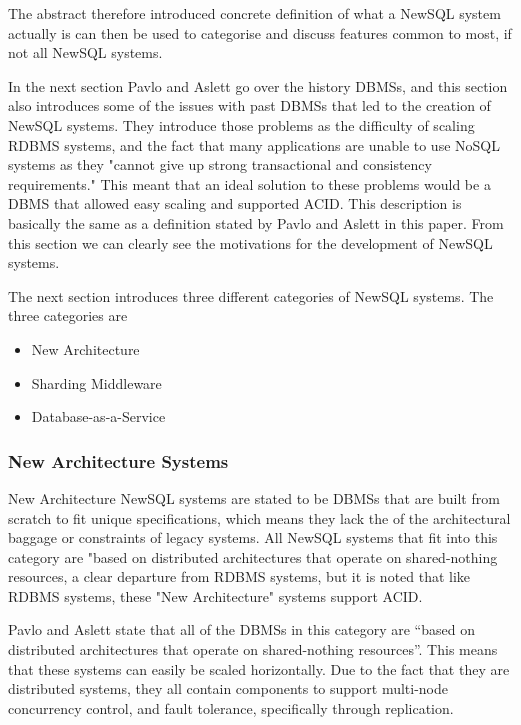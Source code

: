 \documentclass[10pt, conference]{IEEEtran}
\begin{document}
The abstract therefore introduced concrete definition of what a NewSQL system actually is can then be used to categorise and discuss features common to most, if not all NewSQL systems.

In the next section Pavlo and Aslett go over the history DBMSs, and this section also introduces some of the issues with past DBMSs that led to the creation of NewSQL systems. They introduce those problems as the difficulty of scaling RDBMS systems, and the fact that many applications are unable to use NoSQL systems as they "cannot give up strong transactional and consistency requirements." This meant that an ideal solution to these problems would be a DBMS that allowed easy scaling and supported ACID. This description is basically the same as a definition stated by Pavlo and Aslett in this paper. From this section we can clearly see the motivations for the development of NewSQL systems.

The next section introduces three different categories of NewSQL systems. The three categories are

\begin{itemize}
	\item{New Architecture}
	\item{Sharding Middleware}
	\item{Database-as-a-Service}
\end{itemize}

\subsubsection{New Architecture Systems}

New Architecture NewSQL systems are stated to be DBMSs that are built from scratch to fit unique specifications, which means they lack the of the architectural baggage or constraints of legacy systems. All NewSQL systems that fit into this category are "based on distributed architectures that operate on shared-nothing resources, a clear departure from RDBMS systems, but it is noted that like RDBMS systems, these "New Architecture" systems support ACID.

Pavlo and Aslett state that all of the DBMSs in this category are ``based on distributed architectures that operate on shared-nothing resources''. This means that these systems can easily be scaled horizontally. Due to the fact that they are distributed systems, they all contain components to support multi-node concurrency control, and fault tolerance, specifically through replication.
\end{document}
